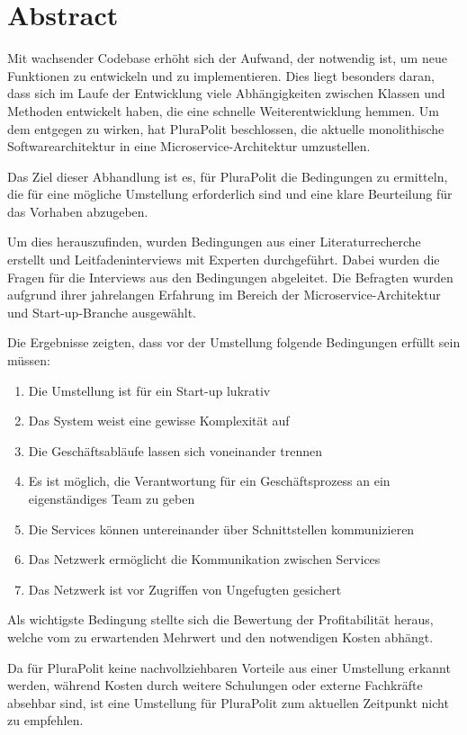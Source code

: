 \section*{Abstract}

Mit wachsender Codebase erhöht sich der Aufwand, der notwendig ist, um neue Funktionen zu entwickeln und zu implementieren. Dies liegt besonders daran, dass sich im Laufe der Entwicklung viele Abhängigkeiten zwischen Klassen und Methoden entwickelt haben, die eine schnelle Weiterentwicklung hemmen. Um dem entgegen zu wirken, hat PluraPolit beschlossen, die aktuelle monolithische Softwarearchitektur in eine Microservice-Architektur umzustellen.


Das Ziel dieser Abhandlung ist es, für PluraPolit die Bedingungen zu ermitteln, die für eine mögliche Umstellung erforderlich sind und eine klare Beurteilung für das Vorhaben abzugeben.

Um dies herauszufinden, wurden Bedingungen aus einer Literaturrecherche erstellt und Leitfadeninterviews mit Experten durchgeführt. Dabei wurden die Fragen für die Interviews aus den Bedingungen abgeleitet. Die Befragten wurden aufgrund ihrer jahrelangen Erfahrung im Bereich der Microservice-Architektur und Start-up-Branche ausgewählt.

Die Ergebnisse zeigten, dass vor der Umstellung folgende Bedingungen erfüllt sein müssen:
\begin{enumerate}
	\item Die Umstellung ist für ein Start-up lukrativ
	\item Das System weist eine gewisse Komplexität auf
	\item Die Geschäftsabläufe lassen sich voneinander trennen
	\item Es ist möglich, die Verantwortung für ein Geschäftsprozess an ein eigenständiges Team zu geben
	\item Die Services können untereinander über Schnittstellen kommunizieren
	\item Das Netzwerk ermöglicht die Kommunikation zwischen Services
	\item Das Netzwerk ist vor Zugriffen von Ungefugten gesichert
\end{enumerate}

Als wichtigste Bedingung stellte sich die Bewertung der Profitabilität heraus, welche vom zu erwartenden Mehrwert und den notwendigen Kosten abhängt.

Da für PluraPolit keine nachvollziehbaren Vorteile aus einer Umstellung erkannt werden, während Kosten durch weitere Schulungen oder externe Fachkräfte absehbar sind, ist eine Umstellung für PluraPolit zum aktuellen Zeitpunkt nicht zu empfehlen.

